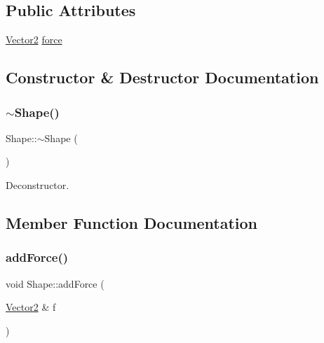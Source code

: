 \subsection*{Public Attributes}
\begin{DoxyCompactItemize}
\item 
\mbox{\hyperlink{struct_vector2}{Vector2}} \mbox{\hyperlink{class_shape_a6047166afe804fa01ab78362b438bbef}{force}}
\end{DoxyCompactItemize}


\subsection{Constructor \& Destructor Documentation}
\mbox{\label{class_shape_a39fe45638d872f0ce9670d7f85290161}} 
\subsubsection{\texorpdfstring{$\sim$Shape()}{~Shape()}}
{\footnotesize\ttfamily Shape\+::$\sim$\+Shape (\begin{DoxyParamCaption}{ }\end{DoxyParamCaption})\hspace{0.3cm}{\ttfamily [pure virtual]}}



Deconstructor. 



\subsection{Member Function Documentation}
\mbox{\label{class_shape_a2fcffede033450a219278164b864e8a3}} 
\subsubsection{\texorpdfstring{addForce()}{addForce()}}
{\footnotesize\ttfamily void Shape\+::add\+Force (\begin{DoxyParamCaption}\item[{\mbox{\hyperlink{struct_vector2}{Vector2}} \&}]{f }\end{DoxyParamCaption})\hspace{0.3cm}{\ttfamily [virtual]}}



